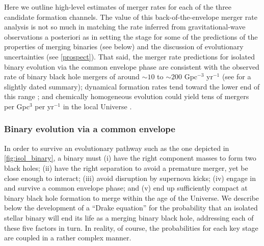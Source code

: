 \documentclass[iop,onecolumn]{revtex4}
\begin{document}
Here we outline high-level estimates of merger rates for each of the three candidate formation channels. The value of this back-of-the-envelope merger rate analysis is not so much in matching the rate inferred from gravitational-wave observations a posteriori as in setting the stage for some of the predictions of the properties of merging binaries (see below) and the discussion of evolutionary uncertainties (see \autoref{prospect}).  That said, the merger rate predictions for isolated binary evolution via the common envelope phase are consistent with the observed rate of binary black hole mergers of around $\sim 10$ to $\sim 200$ Gpc$^{-3}$ yr$^{-1}$ \citep{GW150914:rates,GW170104} (see \citet{ratesdoc} for a slightly dated summary); dynamical formation rates tend toward the lower end of this range \citep{Rodriguez:2016,Park:2017,FragioneKocsis:2018}; and chemically homogeneous evolution could yield tens of mergers per Gpc$^{3}$ per yr$^{-1}$ in the local Universe \citep{MandeldeMink:2016,Marchant:2016}.

\subsubsection{Binary evolution via a common envelope}\label{sec:CErates}

In order to survive an evolutionary pathway such as the one depicted in \autoref{fig:isol_binary}, a binary must (i) have the right component masses to form two black holes; (ii) have the right separation to avoid a premature merger, yet be close enough to interact; (iii) avoid disruption by supernova kicks; (iv) engage in and survive a common envelope phase; and (v) end up sufficiently compact at binary black hole formation to merge within the age of the Universe. We describe below the development of a ``Drake equation'' for the probability that an isolated stellar binary will end its life as a merging binary black hole, addressing each of these five factors in turn.   In reality, of course, the probabilities for each key stage are coupled in a rather complex manner.
\end{document}
